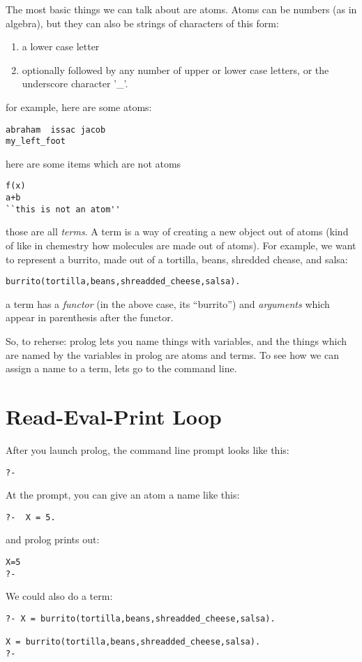\documentclass{book}[9pt]
\begin{document}
The most basic things we can talk about are atoms.  Atoms can be
numbers (as in algebra), but they can also be strings of characters of
this form:
\begin{enumerate}
\item a lower case letter
\item optionally followed by any number of upper or lower case letters,
or the underscore character '\_'.
\end{enumerate}
\noindent for example, here are some atoms:
\begin{verbatim}
abraham  issac jacob
my_left_foot
\end{verbatim}
\noindent here are some items which are not atoms
\begin{verbatim}
f(x)
a+b
``this is not an atom''
\end{verbatim}
\noindent those are all {\em terms}.  A term is a way of creating a
new object out of atoms (kind of like in chemestry how molecules are
made out of atoms).  For example, we want to represent a burrito, made
out of a tortilla, beans, shredded chease, and salsa:
\begin{verbatim}
burrito(tortilla,beans,shreadded_cheese,salsa).
\end{verbatim}
\noindent a term has a {\em functor} (in the above case, its ``burrito'') and
{\em arguments} which appear in parenthesis after the functor.

So, to reherse: prolog lets you name things with variables, and the
things which are named by the variables in prolog are atoms and terms.
To see how we can assign a name to a term, lets go to the command
line.

\section{Read-Eval-Print Loop}

After you launch prolog, the command line prompt looks like this:
\begin{verbatim}
?-
\end{verbatim}
\noindent At the prompt, you can give an atom a name like this:
\begin{verbatim}
?-  X = 5.
\end{verbatim}
\noindent and prolog prints out:
\begin{verbatim}
X=5
?-
\end{verbatim}
\noindent We could also do a term:
\begin{verbatim}
?- X = burrito(tortilla,beans,shreadded_cheese,salsa).

X = burrito(tortilla,beans,shreadded_cheese,salsa).
?-
\end{verbatim}
\end{document}
